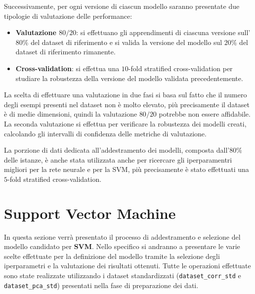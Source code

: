Successivamente, per ogni versione di ciascun modello saranno presentate due
tipologie di valutazione delle performance:
\begin{itemize}
    \item \textbf{Valutazione $80/20$}: si effettuano gli apprendimenti di
          ciascuna versione sull'$80\%$ del dataset di riferimento e si valida
          la versione del modello sul $20\%$ del dataset di riferimento rimanente.
    \item \textbf{Cross-validation}: si effettua una $10$-fold stratified
          cross-validation per studiare la robustezza della versione del modello
          validata precedentemente.
\end{itemize}
La scelta di effettuare una valutazione in due fasi si basa sul fatto che il
numero degli esempi presenti nel dataset non è molto elevato, più precisamente
il dataset è di medie dimensioni, quindi la valutazione $80/20$ potrebbe non
essere affidabile. La seconda valutazione si effettua per verificare la
robustezza dei modelli creati, calcolando gli intervalli di confidenza delle
metriche di valutazione.

La porzione di dati dedicata all'addestramento dei modelli, composta dall'$80\%$
delle istanze, è anche stata utilizzata anche per ricercare gli iperparamentri
migliori per la rete neurale e per la SVM, più precisamente è stato effettuati
una $5$-fold stratified cross-validation.
\section{Support Vector Machine}
In questa sezione verrà presentato il processo di addestramento e selezione del
modello candidato per \textbf{SVM}. Nello specifico si andranno a presentare le
varie scelte effettuate per la definizione del modello tramite la selezione
degli iperparametri e la valutazione dei risultati ottenuti. Tutte le operazioni
effettuate sono state realizzate utilizzando i dataset standardizzati
(\texttt{dataset\_corr\_std} e \texttt{dataset\_pca\_std}) presentati nella fase
di preparazione dei dati.
